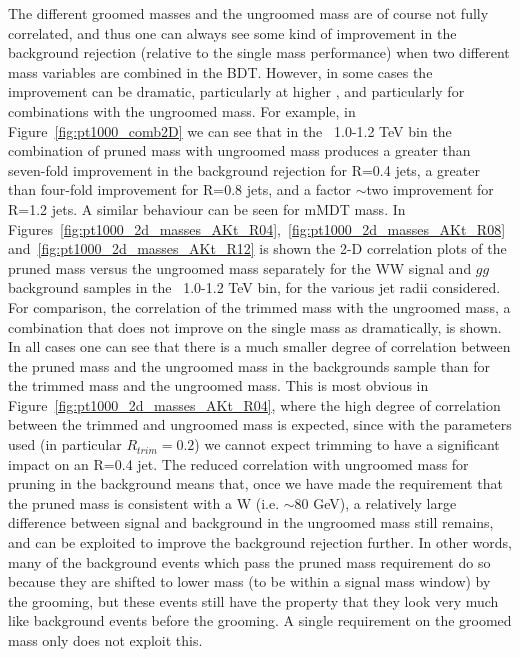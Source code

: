 The different groomed masses and the ungroomed mass are of course not
fully correlated, and thus one can always see some kind of improvement
in the background rejection (relative to the single mass performance) when two different mass variables are combined
in the BDT. However, in some cases the improvement can be dramatic,
particularly at higher \pt, and particularly for combinations with the
ungroomed mass. For example, in Figure~\ref{fig:pt1000_comb2D} we can
see that in the \pt~1.0-1.2 TeV bin the combination of pruned mass with
ungroomed mass produces a greater than seven-fold improvement in the
background rejection for R=0.4 jets, a greater than four-fold
improvement for R=0.8 jets, and a factor $\sim$two improvement for
R=1.2 jets. A similar behaviour can be seen for mMDT mass. 
In Figures~\ref{fig:pt1000_2d_masses_AKt_R04},~\ref{fig:pt1000_2d_masses_AKt_R08}
and~\ref{fig:pt1000_2d_masses_AKt_R12} is shown the 2-D correlation plots of the pruned mass versus the
ungroomed mass separately for the WW signal and $gg$ background
samples in the \pt~1.0-1.2 TeV bin, for the various jet radii
considered. For comparison, the correlation of the trimmed mass with
the ungroomed mass, a combination that does not improve on the single
mass as dramatically, is shown. In all cases one can see that there is
a much smaller degree of correlation between the pruned mass and the
ungroomed mass in the backgrounds sample than for the trimmed mass and the ungroomed mass. This
is most obvious in Figure~\ref{fig:pt1000_2d_masses_AKt_R04}, where
the high degree of correlation between the trimmed and ungroomed mass
is expected, since with the parameters used (in particular
$R_{trim} = 0.2$) we cannot expect trimming to have a significant
impact on an R=0.4 jet. The reduced correlation with ungroomed mass
for pruning in the background means that, once we have made the requirement that the
pruned mass is consistent with a W (i.e. $\sim$80 GeV), a relatively large difference
between signal and background in the ungroomed mass still remains, and
can be exploited to improve the background rejection further. In other
words, many of the background events which pass the pruned mass
requirement do so because they are shifted to lower mass (to be within
a signal mass window) by the grooming, but these events still have the
property that they look very much like background events before the
grooming. A single requirement on the groomed mass only does not
exploit this.


